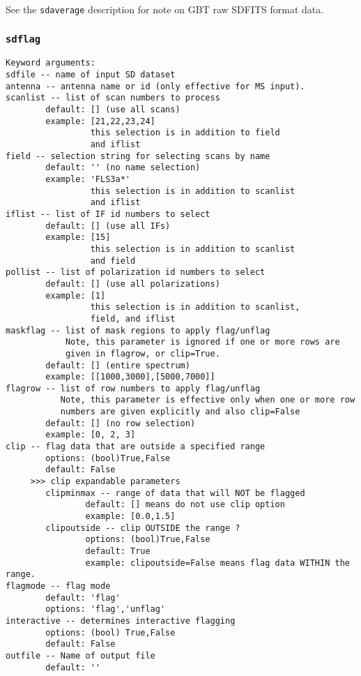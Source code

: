           See the {\tt sdaverage} description for note on GBT raw SDFITS format data.


\subsubsection{{\tt sdflag}}
\label{section:sd.sdtasks.tasks.sdflag}

\begin{verbatim}
Keyword arguments:
sdfile -- name of input SD dataset
antenna -- antenna name or id (only effective for MS input). 
scanlist -- list of scan numbers to process
        default: [] (use all scans)
        example: [21,22,23,24]
                 this selection is in addition to field
                 and iflist
field -- selection string for selecting scans by name
        default: '' (no name selection)
        example: 'FLS3a*'
                 this selection is in addition to scanlist
                 and iflist
iflist -- list of IF id numbers to select
        default: [] (use all IFs)
        example: [15]
                 this selection is in addition to scanlist
                 and field
pollist -- list of polarization id numbers to select
        default: [] (use all polarizations)
        example: [1]
                 this selection is in addition to scanlist,
                 field, and iflist
maskflag -- list of mask regions to apply flag/unflag 
            Note, this parameter is ignored if one or more rows are 
            given in flagrow, or clip=True.
        default: [] (entire spectrum)
        example: [[1000,3000],[5000,7000]]
flagrow -- list of row numbers to apply flag/unflag
           Note, this parameter is effective only when one or more row 
           numbers are given explicitly and also clip=False
        default: [] (no row selection)
        example: [0, 2, 3]
clip -- flag data that are outside a specified range
        options: (bool)True,False
        default: False
     >>> clip expandable parameters
        clipminmax -- range of data that will NOT be flagged
                default: [] means do not use clip option
                example: [0.0,1.5]
        clipoutside -- clip OUTSIDE the range ?
                options: (bool)True,False
                default: True
                example: clipoutside=False means flag data WITHIN the range.
flagmode -- flag mode
        default: 'flag'
        options: 'flag','unflag'
interactive -- determines interactive flagging
        options: (bool) True,False
        default: False
outfile -- Name of output file
        default: ''

\end{verbatim}
